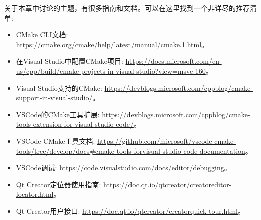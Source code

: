 关于本章中讨论的主题，有很多指南和文档。可以在这里找到一个非详尽的推荐清单:

\begin{itemize}
\item 
CMake CLI文档: \url{https://cmake.org/cmake/help/latest/manual/cmake.1.html}。

\item
在Visual Studio中配置CMake项目: \url{https://docs.microsoft.com/en-us/cpp/build/cmake-projects-in-visual-studio?view=msvc-160}。

\item
Visual Studio支持的CMake: \url{https://devblogs.microsoft.com/cppblog/cmake-support-in-visual-studio/}。

\item
VSCode的CMake工具扩展: \url{https://devblogs.microsoft.com/cppblog/cmake-tools-extension-for-visual-studio-code/}。

\item
VSCode CMake工具文档: \url{https://github.com/microsoft/vscode-cmake-tools/tree/develop/docs#cmake-tools-forvisual-studio-code-documentation}。

\item
VSCode调试: \url{https://code.visualstudio.com/docs/editor/debugging}。

\item
Qt Creator定位器使用指南: \url{https://doc.qt.io/qtcreator/creatoreditor-locator.html}。

\item
Qt Creator用户接口: \url{https://doc.qt.io/qtcreator/creatorquick-tour.html}。
\end{itemize}
